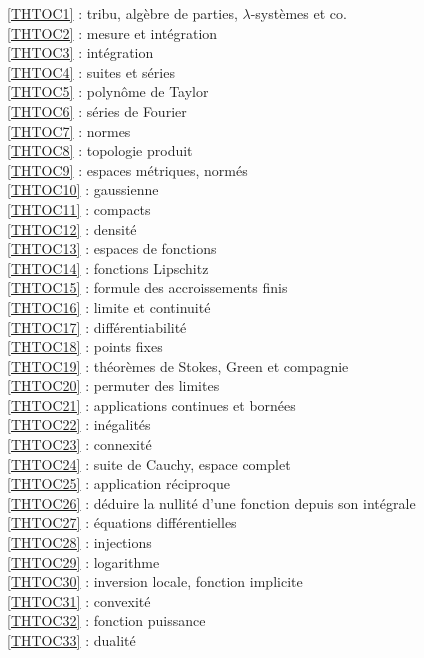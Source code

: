 \ref {THTOC1} : tribu, algèbre de parties, \( \lambda \)-systèmes et co.\\
\ref {THTOC2} : mesure et intégration\\
\ref {THTOC3} : intégration\\
\ref {THTOC4} : suites et séries\\
\ref {THTOC5} : polynôme de Taylor\\
\ref {THTOC6} : séries de Fourier\\
\ref {THTOC7} : normes\\
\ref {THTOC8} : topologie produit\\
\ref {THTOC9} : espaces métriques, normés\\
\ref {THTOC10} : gaussienne\\
\ref {THTOC11} : compacts\\
\ref {THTOC12} : densité\\
\ref {THTOC13} : espaces de fonctions\\
\ref {THTOC14} : fonctions Lipschitz\\
\ref {THTOC15} : formule des accroissements finis\\
\ref {THTOC16} : limite et continuité\\
\ref {THTOC17} : différentiabilité\\
\ref {THTOC18} : points fixes\\
\ref {THTOC19} : théorèmes de Stokes, Green et compagnie\\
\ref {THTOC20} : permuter des limites\\
\ref {THTOC21} : applications continues et bornées\\
\ref {THTOC22} : inégalités\\
\ref {THTOC23} : connexité\\
\ref {THTOC24} : suite de Cauchy, espace complet\\
\ref {THTOC25} : application réciproque\\
\ref {THTOC26} : déduire la nullité d'une fonction depuis son intégrale\\
\ref {THTOC27} : équations différentielles\\
\ref {THTOC28} : injections\\
\ref {THTOC29} : logarithme\\
\ref {THTOC30} : inversion locale, fonction implicite\\
\ref {THTOC31} : convexité\\
\ref {THTOC32} : fonction puissance\\
\ref {THTOC33} : dualité\\
